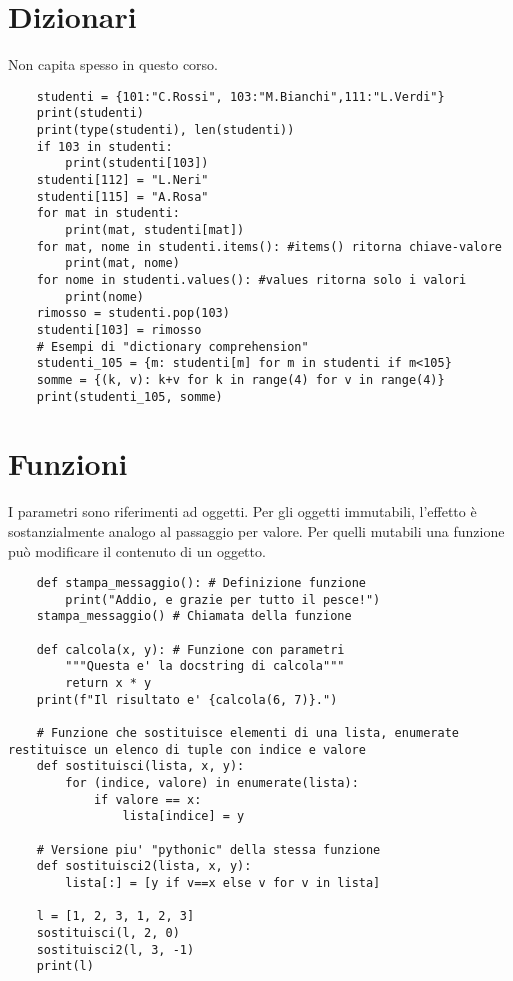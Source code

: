 \section{Dizionari}

Non capita spesso in questo corso.

\begin{lstlisting}
	studenti = {101:"C.Rossi", 103:"M.Bianchi",111:"L.Verdi"}
	print(studenti)
	print(type(studenti), len(studenti))
	if 103 in studenti:
		print(studenti[103])
	studenti[112] = "L.Neri"
	studenti[115] = "A.Rosa"
	for mat in studenti:
		print(mat, studenti[mat])
	for mat, nome in studenti.items(): #items() ritorna chiave-valore
		print(mat, nome)
	for nome in studenti.values(): #values ritorna solo i valori
		print(nome)
	rimosso = studenti.pop(103)
	studenti[103] = rimosso
	# Esempi di "dictionary comprehension"
	studenti_105 = {m: studenti[m] for m in studenti if m<105}
	somme = {(k, v): k+v for k in range(4) for v in range(4)}
	print(studenti_105, somme)
\end{lstlisting}

\section{Funzioni}

I parametri sono riferimenti ad oggetti. Per gli oggetti immutabili, l'effetto è sostanzialmente analogo al passaggio per valore. Per quelli mutabili una funzione può modificare il contenuto di un oggetto.

\begin{lstlisting}
	def stampa_messaggio(): # Definizione funzione
		print("Addio, e grazie per tutto il pesce!")
	stampa_messaggio() # Chiamata della funzione
	
	def calcola(x, y): # Funzione con parametri
		"""Questa e' la docstring di calcola"""
		return x * y
	print(f"Il risultato e' {calcola(6, 7)}.")
	
	# Funzione che sostituisce elementi di una lista, enumerate restituisce un elenco di tuple con indice e valore
	def sostituisci(lista, x, y):
		for (indice, valore) in enumerate(lista):
			if valore == x:
				lista[indice] = y
	
	# Versione piu' "pythonic" della stessa funzione
	def sostituisci2(lista, x, y):
		lista[:] = [y if v==x else v for v in lista]
	
	l = [1, 2, 3, 1, 2, 3]
	sostituisci(l, 2, 0)
	sostituisci2(l, 3, -1)
	print(l)
\end{lstlisting}

